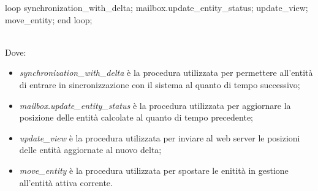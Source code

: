\begin{codiceada}[caption={Template-Code entità attiva}, label=template-code]
loop
	synchronization_with_delta;
	mailbox.update_entity_status;	
	update_view;	
	move_entity;
end loop;
\end{codiceada}
\\
Dove:
\begin{itemize}
\item \textit{synchronization\_with\_delta} è la procedura utilizzata per permettere all'entità di entrare in sincronizzazione con il sistema al quanto di tempo successivo;
\item \textit{mailbox.update\_entity\_status} è la procedura utilizzata per aggiornare la posizione delle entità calcolate al quanto di tempo precedente; \item \textit{update\_view} è la procedura utilizzata per inviare al web server le posizioni delle entità aggiornate al nuovo delta;
\item \textit{move\_entity} è la procedura utilizzata per spostare le enitità in gestione all'entità attiva corrente.
\end{itemize}

